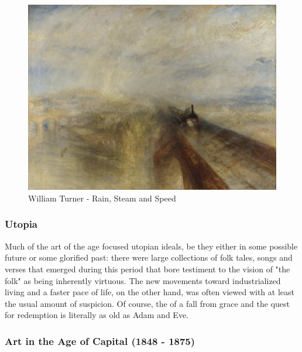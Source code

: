 \documentclass[11pt]{article}
\begin{document}
\begin{figure}[htbp]
\centering
\includegraphics[width=.9\linewidth]{./Turner_-_Rain,_Steam_and_Speed_-_National_Gallery_file.jpg}
\caption{William Turner - Rain, Steam and Speed}
\end{figure} 

\subsubsection{Utopia}
\label{sec:orgcf38146}

Much of the art of the age focused utopian ideals, be they either in
some possible future or some glorified past: there were large
collections of folk tales, songs and verses that emerged during this
period that bore testiment to the vision of "the folk" as being
inherently virtuous. The new movements toward industrialized living
and a faster pace of life, on the other hand, was often viewed with at
least the usual amount of suspicion. Of course, the of a fall from
grace and the quest for redemption is literally as old as Adam and Eve.

\subsubsection{Art in the Age of Capital (1848 - 1875)}
\label{sec:org3a0f895}
\end{document}
